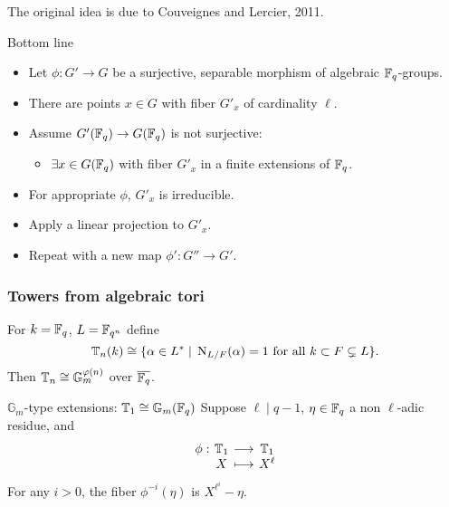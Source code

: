 \documentclass[10pt]{beamer}
\begin{document}
\begin{frame}
	\frametitle{\insertsection}
	
	\begin{block}{}
		The original idea is due to Couveignes and Lercier, 2011.
	\end{block}
	
	\vspace*{3mm}
	\begin{exampleblock}{Bottom line}
		\begin{itemize}
			\item Let $\phi:G' \rightarrow G$ be a surjective, separable morphism of algebraic 
			$\mathbb{F}_q$-groups.
			\item There are points $x \in G$ with fiber $G'_x$ of cardinality $\ell$.
			\item Assume $G'(\mathbb{F}_q) \rightarrow G(\mathbb{F}_q)$ is not surjective:
			 \begin{itemize}
				 \item $\exists x \in G(\mathbb{F}_q)$ with fiber $G'_x$ in a finite extensions of $\mathbb{F}_q$.
			 \end{itemize}
			\item For appropriate $\phi$, $G'_x$ is irreducible.
			\item Apply a linear projection to $G'_x$.
			\item Repeat with a new map $\phi':G''\to G'$.
		\end{itemize}
	\end{exampleblock}
\end{frame}


\begin{frame}
	\frametitle{Towers from algebraic tori}
	
	\begin{definition}
		For $k=\mathbb{F}_q$, $L=\mathbb{F}_{q^n}$ define 
		\begin{equation*}
			\label{eq:Tn}
			\mathbb{T}_n(k) \cong \{\alpha\in L^\ast \;|\; \operatorname{N}_{L/F}(\alpha) = 1 \text{ for all } k\subset F\subsetneq L \}.
		\end{equation*}
		Then $\mathbb{T}_n \cong \mathbb{G}_m^{\varphi(n)}$ over $\overline{\mathbb{F}_q}$.
	\end{definition}
	\vspace*{5mm}
	\begin{exampleblock}{$\mathbb{G}_m$-type extensions: $\mathbb{T}_1 \cong \mathbb{G}_m(\mathbb{F}_q)$}
		Suppose $\ell \mid q-1$, $\eta \in \mathbb{F}_q$ a non $\ell$-adic residue, and
		\[
		\setlength{\arraycolsep}{2pt}
		\begin{array}{cccc}
			\phi: & \mathbb{T}_1 & \longrightarrow & \mathbb{T}_1 \\
			& X & \longmapsto & X^\ell
		\end{array}
		\]
		For any $i>0$, the fiber $\phi^{-i}(\eta)$ is $X^{\ell^i}-\eta$.
	\end{exampleblock}
\end{frame}
\end{document}

